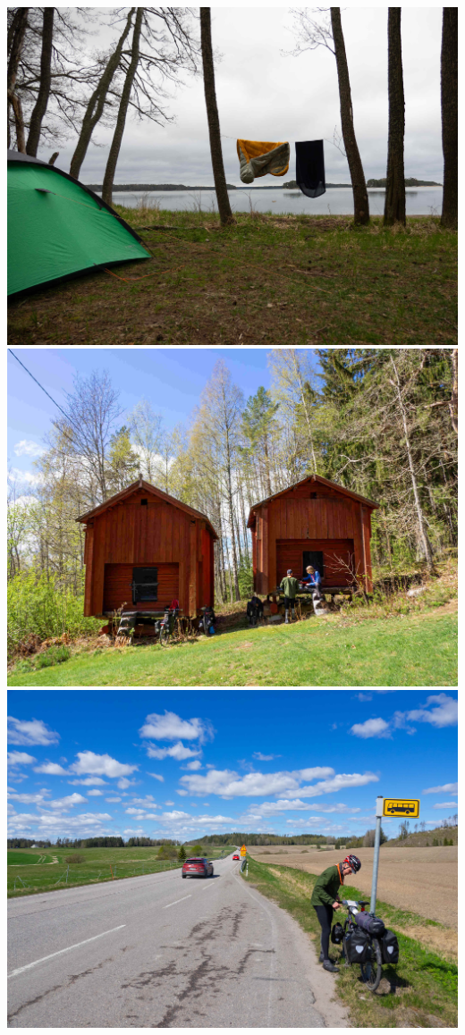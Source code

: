 \documentclass[10pt,finnish,a5paper,twoside=semi]{scrartcl}
\begin{document}
\begin{multicols}{2}
	\columnbreak

	\begin{center}
		\noindent\includegraphics[width=0.94\linewidth]{assets/pyörävaellus6}
		\noindent\includegraphics[width=0.94\linewidth]{assets/pyörävaellus7}
		\noindent\includegraphics[width=0.94\linewidth]{assets/pyörävaellus8}

\end{center}
\end{multicols}
\end{document}
